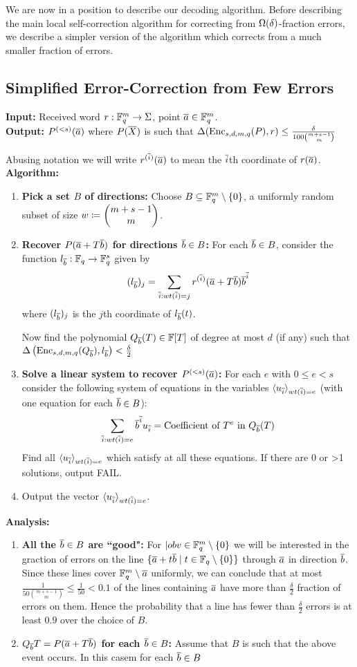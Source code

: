 We are now in a position to describe our decoding algorithm. Before describing the main local self-correction algorithm for correcting from $\Omega(\delta)$-fraction errors, we describe a simpler version of the algorithm which corrects from a much smaller fraction of errors.
\subsection{Simplified Error-Correction from Few Errors}
\textbf{Input:} Received word $r:\mathbb{F}_q^m\to \Sigma$, point $\overline{a}\in \mathbb{F}_q^m$. \\
\textbf{Output:} $P^{(<s)}(\overline{a})$ where $P(\overline{X})$ is such that $\Delta(\operatorname{Enc}_{s,d,m,q}(P),r)\leq \frac{\delta}{100{{m+s-1}\choose{m}}}$

Abusing notation we will write $r^{(\overline{i})}(\overline{a})$ to mean the $\overline{i}$th coordinate of $r(\overline{a})$.\\
\textbf{Algorithm:}\begin{enumerate}
	\item \textbf{Pick a set $B$ of directions:} Choose $B\subseteq \mathbb{F}_q^m\setminus \{0\}$, a uniformly random subset of size $w\coloneqq \left(\begin{matrix} m+s-1\\ m \end{matrix}\right)$. 
	\item \textbf{Recover $P(\overline{a}+T\overline{b})$ for directions $\overline{b}\in B$:} For each $\overline{b}\in B$, consider the function $l_{\overline{b}}:\mathbb{F}_q\to \mathbb{F}_q^s$ given by $$(l_{\overline{b}})_j=\sum_{\overline{i}:wt(\overline{i})=j}r^{(\overline{i})}(\overline{a}+T\overline{b})\overline{b}^{\overline{i}}$$ where $(l_{\overline{b}})_j$ is the $j$th coordinate of $l_{\overline{b}}(t)$. 
	
	Now find the polynomial $Q_{\overline{b}}(T)\in \mathbb{F}[T]$ of degree at most $d$ (if any) such that $\Delta\left(\operatorname{Enc}_{s,d,m,q}(Q_{\overline{b}}),l_{\overline{b}}\right)<\frac{\delta}2$
	\item \textbf{Solve a linear system to recover $P^{(<s)}(\overline{a})$:} For each $e$ with $0\leq e<s$ consider the following system of equations in the variables $\langle u_{\overline{i}}\rangle_{wt(\overline{i})=e}$ (with one equation for each $\overline{b}\in B$): $$\sum_{\overline{i}:wt(\overline{i})=e}\overline{b}^{\overline{i}}u_{\overline{i}}=\text{Coefficient of $T^e$ in $Q_{\overline{b}}(T)$}$$Find all $\langle u_{\overline{i}}\rangle_{wt(\overline{i})=e}$ which satisfy at all these equations. If there are 0 or >1 solutions, output FAIL.
	\item Output the vector $\langle u_{\overline{i}}\rangle_{wt(\overline{i})=e}$.
\end{enumerate}
\textbf{Analysis:} \begin{enumerate}[label=\bfseries Step \arabic*:,itemindent=0.8cm]
	\item \textbf{All the $\overline{b}\in B$ are ``good":} For $|obv\in \mathbb{F}_q^m\setminus \{0\}$ we will be interested in the graction of errors on the line $\{\overline{a}+t\overline{b}\mid t\in \mathbb{F}_q\setminus \{0\}\}$ through $\overline{a} $ in direction $\overline{b}$. Since these lines cover $\mathbb{F}_q^m\setminus \overline{a}$ uniformly, we can conclude that at most $\frac1{50{{m+s-1}\choose{m}}}\leq \frac{1}{50}<0.1$ of the lines containing $\overline{a}$ have more than $\frac{\delta}{2}$ fraction of errors on them. Hence the probability that a line has fewer than $\frac{\delta}{2}$ errors is at least $0.9$ over the choice of $B$.
	\item \textbf{$Q_{\overline{b}}{T}=P(\overline{a}+T\overline{b})$ for each $\overline{b}\in B$:} Assume that $B$ is such that the above event occurs. In this casem  for each $\overline{b}\in B$ 
\end{enumerate}